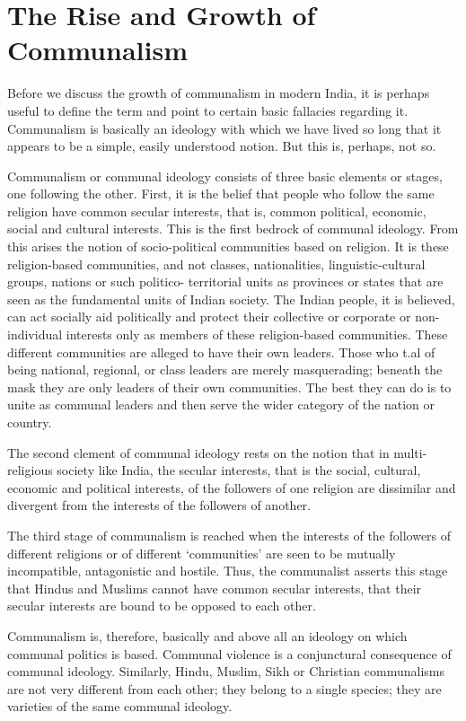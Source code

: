 \cleardoublepage
\chapter{The Rise and Growth of Communalism}



Before we discuss the growth of communalism in modern India, it is perhaps useful to define the term and point to certain basic fallacies regarding it. Communalism is basically an ideology with which we have lived so long that it appears to be a simple, easily understood notion. But this is, perhaps, not so. 

Communalism or communal ideology consists of three basic elements or stages, one following the other. First, it is the belief that people who follow the same religion have common secular interests, that is, common political, economic, social and cultural interests. This is the first bedrock of communal ideology. From this arises the notion of socio-political communities based on religion. It is these religion-based communities, and not classes, nationalities, linguistic-cultural groups, nations or such politico- territorial units as provinces or states that are seen as the fundamental units of Indian society. The Indian people, it is believed, can act socially aid politically and protect their collective or corporate or non-individual interests only as members of these religion-based communities. These different communities are alleged to have their own leaders. Those who t.al of being national, regional, or class leaders are merely masquerading; beneath the mask they are only leaders of their own communities. The best they can do is to unite as communal leaders and then serve the wider category of the nation or country. 

The second clement of communal ideology rests on the notion that in multi-religious society like India, the secular interests, that is the social, cultural, economic and political interests, of the followers of one religion are dissimilar and divergent from the interests of the followers of another. 

The third stage of communalism is reached when the interests of the followers of different religions or of different `communities' are seen to be mutually incompatible, antagonistic and hostile. Thus, the communalist asserts this stage that Hindus and Muslims cannot have common secular interests, that their secular interests are bound to be opposed to each other. 

Communalism is, therefore, basically and above all an ideology on which communal politics is based. Communal violence is a conjunctural consequence of communal ideology. Similarly, Hindu, Muslim, Sikh or Christian communalisms are not very different from each other; they belong to a single species; they are varieties of the same communal ideology. 

